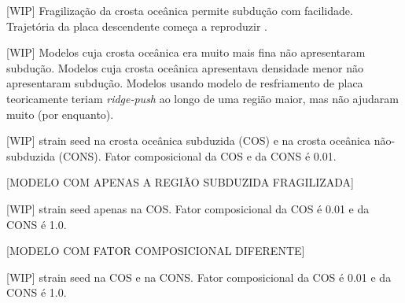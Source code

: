 [WIP] Fragilização da crosta oceânica permite subdução com facilidade. Trajetória da placa descendente começa a reproduzir \citet{strak2021thermo}. 

[WIP] Modelos cuja crosta oceânica era muito mais fina não apresentaram subdução. Modelos cuja crosta oceânica apresentava densidade menor não apresentaram subdução. Modelos usando modelo de resfriamento de placa teoricamente teriam \textit{ridge-push} ao longo de uma região maior, mas não ajudaram muito (por enquanto).

[WIP] strain seed na crosta oceânica subduzida (COS) e na crosta oceânica não-subduzida (CONS). Fator composicional da COS e da CONS é 0.01.

[MODELO COM APENAS A REGIÃO SUBDUZIDA FRAGILIZADA]

[WIP] strain seed apenas na COS. Fator composicional da COS é 0.01 e da CONS é 1.0.

[MODELO COM FATOR COMPOSICIONAL DIFERENTE]

[WIP] strain seed na COS e na CONS. Fator composicional da COS é 0.01 e da CONS é 1.0.








